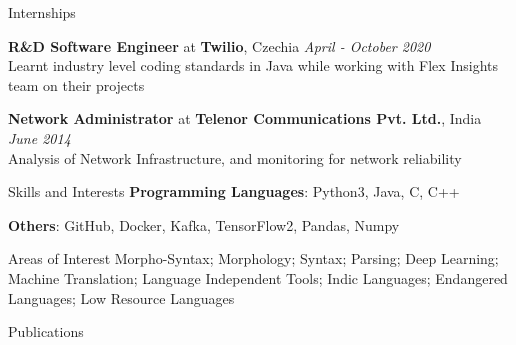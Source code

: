 \documentclass{resume} %
\begin{document}
\begin{rSection}{Internships}

    {\textbf{R\&D Software Engineer} at \textbf{Twilio}, Czechia} 
        \hfill {\textit{April - October 2020}}\\
            Learnt industry level coding standards in Java while working with Flex Insights team on their projects
    
    {\textbf{Network Administrator} at \textbf{Telenor Communications Pvt. Ltd.}, India} 
        \hfill {\textit{June 2014}}\\
            Analysis of Network Infrastructure, and monitoring for network reliability

\end{rSection}


\begin{rSection}{Skills and Interests}
    {\textbf{Programming Languages}: Python3, Java, C, C++}
    
    {\textbf{Others}: GitHub, Docker, Kafka, TensorFlow2, Pandas, Numpy}
    
    \begin{rSubsection}{Areas of Interest}{}{}{}
        Morpho-Syntax; Morphology; Syntax; Parsing; Deep Learning; Machine Translation; 
        Language Independent Tools; Indic Languages; Endangered Languages; Low Resource 
        Languages
    \end{rSubsection}
\end{rSection}


\begin{rSection}{Publications}

    {}

    {}

    {}
    
    {}

    {}

\end{rSection}
\end{document}
